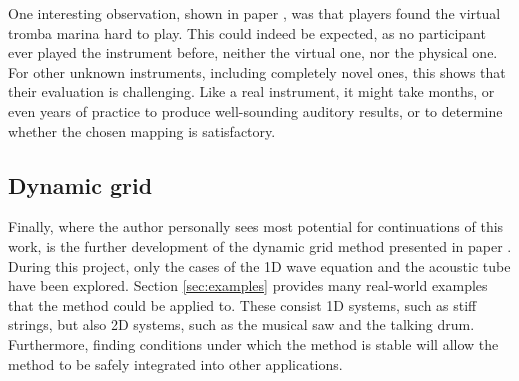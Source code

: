 One interesting observation, shown in paper \citeP[E], was that players found the virtual tromba marina hard to play. This could indeed be expected, as no participant ever played the instrument before, neither the virtual one, nor the physical one. For other unknown instruments, including completely novel ones, this shows that their evaluation is challenging. Like a real instrument, it might take months, or even years of practice to produce well-sounding auditory results, or to determine whether the chosen mapping is satisfactory.




\subsection{Dynamic grid}
Finally, where the author personally sees most potential for continuations of this work, is the further development of the dynamic grid method presented in paper \citeP[G]. During this project, only the cases of the 1D wave equation and the acoustic tube have been explored. Section \ref{sec:examples} provides many real-world examples that the method could be applied to. These consist 1D systems, such as stiff strings, but also 2D systems, such as the musical saw and the talking drum. Furthermore, finding conditions under which the method is stable will allow the method to be safely integrated into other applications.

